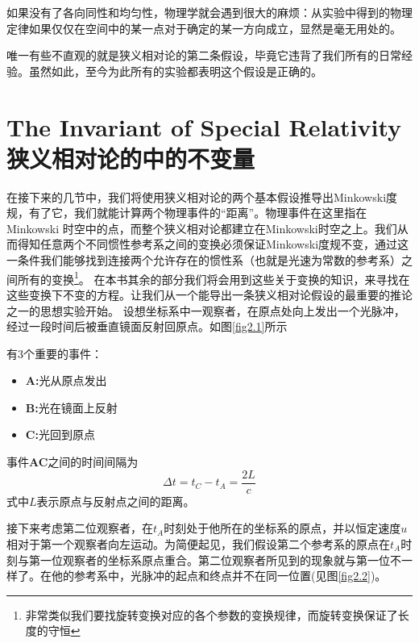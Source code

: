 如果没有了各向同性和均匀性，物理学就会遇到很大的麻烦：从实验中得到的物理定律如果仅仅在空间中的某一点对于确定的某一方向成立，显然是毫无用处的。

唯一有些不直观的就是狭义相对论的第二条假设，毕竟它违背了我们所有的日常经验。虽然如此，至今为此所有的实验都表明这个假设是正确的。
\section[狭义相对论的中的不变量]{The Invariant of Special Relativity \quad 狭义相对论的中的不变量}
\label{sec2.1}
在接下来的几节中，我们将使用狭义相对论的两个基本假设推导出Minkowski度规，有了它，我们就能计算两个物理事件的“距离”。物理事件在这里指在Minkowski 时空中的点，而整个狭义相对论都建立在Minkowski时空之上。我们从而得知任意两个不同惯性参考系之间的变换必须保证Minkowski度规不变，通过这一条件我们能够找到连接两个允许存在的惯性系（也就是光速为常数的参考系）之间所有的变换\footnote{非常类似我们要找旋转变换对应的各个参数的变换规律，而旋转变换保证了长度的守恒}。
在本书其余的部分我们将会用到这些关于变换的知识，来寻找在这些变换下不变的方程。让我们从一个能导出一条狭义相对论假设的最重要的推论之一的思想实验开始。
{}
设想坐标系中一观察者，在原点处向上发出一个光脉冲，经过一段时间后被垂直镜面反射回原点。如图\ref{fig2.1}所示

有3个重要的事件：
\begin{itemize}
  \item {\bf{A:}}光从原点发出
  \item {\bf{B:}}光在镜面上反射
  \item {\bf{C:}}光回到原点
\end{itemize}
事件{\bf{AC}}之间的时间间隔为
\begin{equation}\label{equ2.1}
\Delta t=t_C-t_A=\frac{2L}{c}
\end{equation}
式中$L$表示原点与反射点之间的距离。

{}


接下来考虑第二位观察者，在$t_A$时刻处于他所在的坐标系的原点，并以恒定速度$u$相对于第一个观察者向左运动。为简便起见，我们假设第二个参考系的原点在$t_A$时刻与第一位观察者的坐标系原点重合。第二位观察者所见到的现象就与第一位不一样了。在他的参考系中，光脉冲的起点和终点并不在同一位置(见图\ref{fig2.2})。

